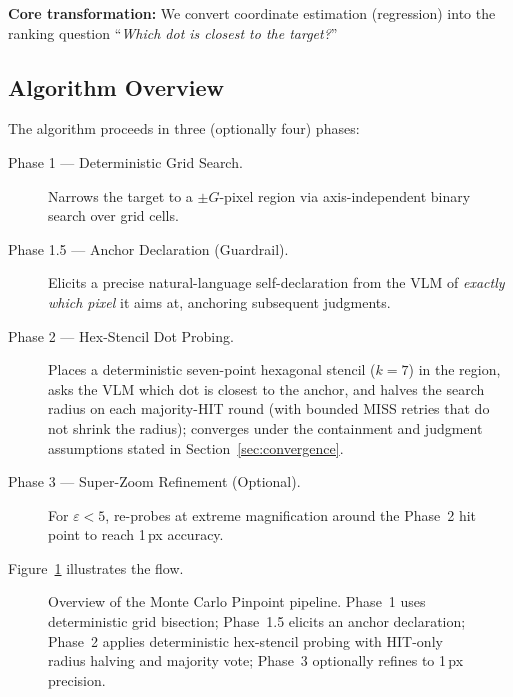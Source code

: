 \documentclass[sigconf,nonacm]{acmart}
\begin{document}
\textbf{Core transformation:} We convert coordinate estimation
(regression) into the ranking question ``\emph{Which dot is closest
to the target?}''

\subsection{Algorithm Overview}
\label{sec:overview}

The algorithm proceeds in three (optionally four) phases:

\begin{description}
  \item[Phase 1 --- Deterministic Grid Search.]
    Narrows the target to a $\pm G$-pixel region via axis-independent
    binary search over grid cells.
  \item[Phase 1.5 --- Anchor Declaration (Guardrail).]
    Elicits a precise natural-language self-declaration from the VLM
    of \emph{exactly which pixel} it aims at, anchoring subsequent
    judgments.
  \item[Phase 2 --- Hex-Stencil Dot Probing.]
    Places a deterministic seven-point hexagonal stencil ($k{=}7$) in
    the region, asks the VLM which dot is closest to the anchor, and
    halves the search radius on each majority-HIT round (with bounded
    MISS retries that do not shrink the radius); converges under the
    containment and judgment assumptions stated in
    Section~\ref{sec:convergence}.
  \item[Phase 3 --- Super-Zoom Refinement (Optional).]
    For $\varepsilon < 5$, re-probes at extreme magnification around the
    Phase~2 hit point to reach 1\,px accuracy.
\end{description}

Figure~\ref{fig:overview} illustrates the flow.

\begin{figure}[t]
  \centering
  \resizebox{\columnwidth}{!}{}
  \caption{Overview of the Monte Carlo Pinpoint pipeline.
    Phase~1 uses deterministic grid bisection; Phase~1.5 elicits an
    anchor declaration; Phase~2 applies deterministic hex-stencil
    probing with HIT-only radius halving and majority vote; Phase~3
    optionally refines to 1\,px precision.}
  \label{fig:overview}
\end{figure}
\end{document}

